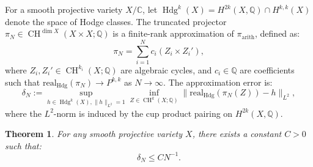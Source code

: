 \documentclass[11pt]{article}
\newtheorem{theorem}{Theorem}[section]
\DeclareMathOperator{\CH}{CH}
\DeclareMathOperator{\Hdg}{Hdg}
\begin{document}
\begin{definition}\label{def:deltaN}
For a smooth projective variety \( X/\mathbb{C} \), let \(\Hdg^k(X) = H^{2k}(X, \mathbb{Q}) \cap H^{k,k}(X)\) denote the space of Hodge classes. The truncated projector \(\pi_N \in \CH^{\dim X}(X \times X; \mathbb{Q})\) is a finite-rank approximation of \(\pi_{\mathrm{arith}}\), defined as:
\[
\pi_N = \sum_{i=1}^N c_i (Z_i \times Z_i'),
\]
where \( Z_i, Z_i' \in \CH^{k_i}(X; \mathbb{Q}) \) are algebraic cycles, and \( c_i \in \mathbb{Q} \) are coefficients such that \(\mathrm{real}_{\mathrm{Hdg}}(\pi_N) \to P^{k,k}\) as \( N \to \infty \). The approximation error is:
\[
\delta_N := \sup_{h \in \Hdg^k(X), \|h\|_{L^2}=1} \inf_{Z \in \CH^k(X; \mathbb{Q})} \|\mathrm{real}_{\mathrm{Hdg}}(\pi_N(Z)) - h\|_{L^2},
\]
where the \( L^2 \)-norm is induced by the cup product pairing on \( H^{2k}(X, \mathbb{Q}) \).
\end{definition}

\begin{theorem}\label{thm:deltaN}
For any smooth projective variety \( X \), there exists a constant \( C > 0 \) such that:
\[
\delta_N \leq C N^{-1}.
\]
\end{theorem}
\end{document}
